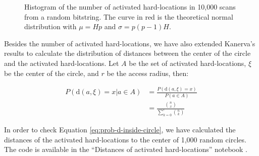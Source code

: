 \begin{figure}[!htb]
  \centering

  \caption{Histogram of the number of activated hard-locations in 10,000 scans from a random bitstring. The curve in red is the theoretical normal distribution with $\mu = Hp$ and $\sigma = p(p-1)H$.}
  \label{fig:validation-activated-hls}
\end{figure}

Besides the number of activated hard-locations, we have also extended Kanerva's results to calculate the distribution of distances between the center of the circle and the activated hard-locations. Let $A$ be the set of activated hard-locations, $\xi$ be the center of the circle, and $r$ be the access radius, then:

\begin{align}
P(\text{d}(a, \xi)=x | a \in A) &= \frac{P(\text{d}(a, \xi)=x)}{P(a \in A)} \\
    &= \frac{\binom{n}{x}}{\sum_{k=0}^r \binom{n}{k}} \label{eq:prob-d-inside-circle}
\end{align}

In order to check Equation \ref{eq:prob-d-inside-circle}, we have calculated the distances of the activated hard-locations to the center of 1,000 random circles. The code is available in the ``Distances of activated hard-locations'' notebook \citep{sdmframework}.

